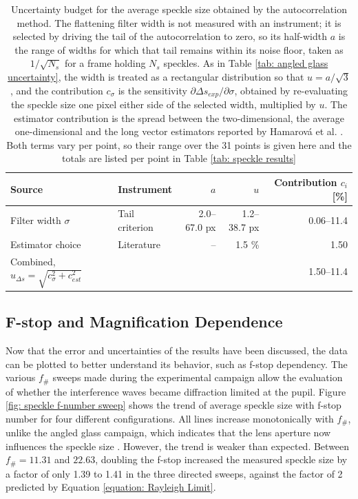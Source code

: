 \begin{table}[htbp]
    \centering
    \caption[Uncertainty budget of the average speckle size]{Uncertainty budget for the average speckle size obtained by the autocorrelation method. The flattening filter width is not measured with an instrument; it is selected by driving the tail of the autocorrelation to zero, so its half-width $a$ is the range of widths for which that tail remains within its noise floor, taken as $1/\sqrt{N_s}$ for a frame holding $N_s$ speckles. As in Table \ref{tab: angled glass uncertainty}, the width is treated as a rectangular distribution so that $u = a/\sqrt{3}$ \cite{JCGM2008}, and the contribution $c_\sigma$ is the sensitivity $\partial \Delta s_{exp} / \partial \sigma$, obtained by re-evaluating the speckle size one pixel either side of the selected width, multiplied by $u$. The estimator contribution is the spread between the two-dimensional, the average one-dimensional and the long vector estimators reported by Hamarová et al. \cite{Hamarova2016}. Both terms vary per point, so their range over the 31 points is given here and the totals are listed per point in Table \ref{tab: speckle results}}
    \label{tab: speckle size uncertainty}
    \begin{tabular}{llrrr}
        \toprule
        Source & Instrument & $a$ & $u$ & Contribution $c_i$ [\%] \\
        \midrule
        Filter width $\sigma$      & Tail criterion & 2.0--67.0 px & 1.2--38.7 px & 0.06--11.4 \\
        Estimator choice           & Literature     & --           & 1.5 \%       & 1.50 \\
        \midrule
        Combined, $u_{\Delta s} = \sqrt{c_\sigma^2 + c_{est}^2}$ &  &  &  & 1.50--11.4 \\
        \bottomrule
    \end{tabular}
\end{table}


\subsection{F-stop and Magnification Dependence}
\label{subsection: Speckle Aperture and Magnification}

Now that the error and uncertainties of the results have been discussed, the data can be plotted to better understand its behavior, such as f-stop dependency. The various $f_\#$ sweeps made during the experimental campaign allow the evaluation of whether the interference waves became diffraction limited at the pupil. Figure \ref{fig: speckle f-number sweep} shows the trend of average speckle size with f-stop number for four different configurations. All lines increase monotonically with $f_\#$, unlike the angled glass campaign, which indicates that the lens aperture now influences the speckle size \cite{Goodman2020}. However, the trend is weaker than expected. Between $f_\# = 11.31$ and $22.63$, doubling the f-stop increased the measured speckle size by a factor of only 1.39 to 1.41 in the three directed sweeps, against the factor of 2 predicted by Equation \ref{equation: Rayleigh Limit}.

